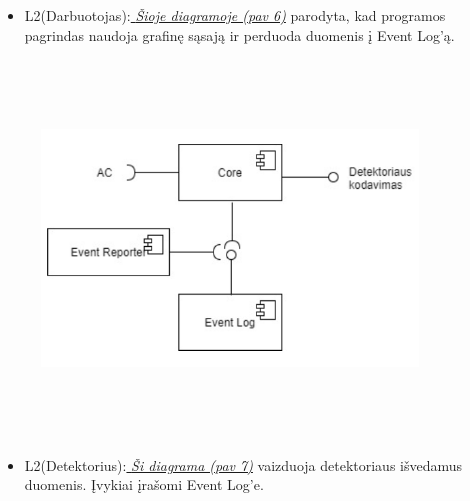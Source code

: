 \documentclass[oneside]{VUMIFPSkursinis}
\begin{document}
\begin{itemize}
		\item L2(Darbuotojas):\hyperref[fig:l2darb]{\textit{  Šioje diagramoje (pav 6)}}  parodyta, kad programos pagrindas naudoja grafinę sąsają ir perduoda duomenis į Event Log’ą. 
\end{itemize}
\begin{figure}[H]
\centering	
	\includegraphics[width=10cm,height=10cm,keepaspectratio]{l2det.png}
	\caption{}
	\label{fig:l2det}
\end{figure}
		
\begin{itemize}
		\item L2(Detektorius):\hyperref[fig:l2det]{\textit{ Ši diagrama (pav 7)}} vaizduoja detektoriaus išvedamus duomenis. Įvykiai įrašomi Event Log’e.
\end{itemize}
\end{document}
